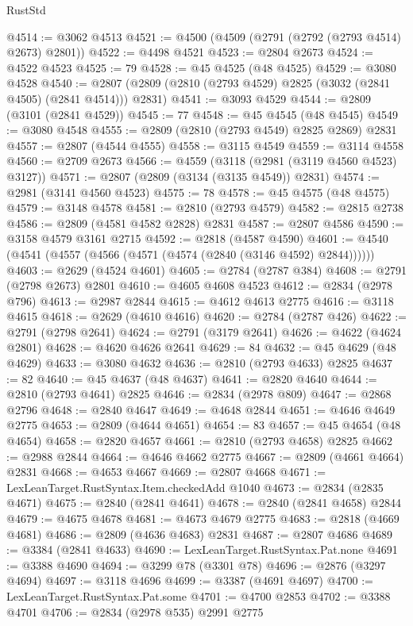 \begin{lexlean}{RustStd}
\begin{coremodule}
{\begin{coremodule}
{{{{{{{{{{{{{{{{{{{{{{{{{{{{{{{{{@4514 := @3062 @4513
@4521 := @4500 (@4509 (@2791 (@2792 (@2793 @4514) @2673) @2801))
@4522 := @4498 @4521
@4523 := @2804 @2673
@4524 := @4522 @4523
@4525 := 79
@4528 := @45 @4525 (@48 @4525)
@4529 := @3080 @4528
@4540 := @2807 (@2809 (@2810 (@2793 @4529) @2825 (@3032 (@2841 @4505) (@2841 @4514))) @2831)
@4541 := @3093 @4529
@4544 := @2809 (@3101 (@2841 @4529))
@4545 := 77
@4548 := @45 @4545 (@48 @4545)
@4549 := @3080 @4548
@4555 := @2809 (@2810 (@2793 @4549) @2825 @2869) @2831
@4557 := @2807 (@4544 @4555)
@4558 := @3115 @4549
@4559 := @3114 @4558
@4560 := @2709 @2673
@4566 := @4559 (@3118 (@2981 (@3119 @4560 @4523) @3127))
@4571 := @2807 (@2809 (@3134 (@3135 @4549)) @2831)
@4574 := @2981 (@3141 @4560 @4523)
@4575 := 78
@4578 := @45 @4575 (@48 @4575)
@4579 := @3148 @4578
@4581 := @2810 (@2793 @4579)
@4582 := @2815 @2738
@4586 := @2809 (@4581 @4582 @2828) @2831
@4587 := @2807 @4586
@4590 := @3158 @4579 @3161 @2715
@4592 := @2818 (@4587 @4590)
@4601 := @4540 (@4541 (@4557 (@4566 (@4571 (@4574 (@2840 (@3146 @4592) @2844))))))
@4603 := @2629 (@4524 @4601)
@4605 := @2784 (@2787 @384)
@4608 := @2791 (@2798 @2673) @2801
@4610 := @4605 @4608 @4523
@4612 := @2834 (@2978 @796)
@4613 := @2987 @2844
@4615 := @4612 @4613 @2775
@4616 := @3118 @4615
@4618 := @2629 (@4610 @4616)
@4620 := @2784 (@2787 @426)
@4622 := @2791 (@2798 @2641)
@4624 := @2791 (@3179 @2641)
@4626 := @4622 (@4624 @2801)
@4628 := @4620 @4626 @2641
@4629 := 84
@4632 := @45 @4629 (@48 @4629)
@4633 := @3080 @4632
@4636 := @2810 (@2793 @4633) @2825
@4637 := 82
@4640 := @45 @4637 (@48 @4637)
@4641 := @2820 @4640
@4644 := @2810 (@2793 @4641) @2825
@4646 := @2834 (@2978 @809)
@4647 := @2868 @2796
@4648 := @2840 @4647
@4649 := @4648 @2844
@4651 := @4646 @4649 @2775
@4653 := @2809 (@4644 @4651)
@4654 := 83
@4657 := @45 @4654 (@48 @4654)
@4658 := @2820 @4657
@4661 := @2810 (@2793 @4658) @2825
@4662 := @2988 @2844
@4664 := @4646 @4662 @2775
@4667 := @2809 (@4661 @4664) @2831
@4668 := @4653 @4667
@4669 := @2807 @4668
@4671 := LexLeanTarget.RustSyntax.Item.checkedAdd @1040
@4673 := @2834 (@2835 @4671)
@4675 := @2840 (@2841 @4641)
@4678 := @2840 (@2841 @4658) @2844
@4679 := @4675 @4678
@4681 := @4673 @4679 @2775
@4683 := @2818 (@4669 @4681)
@4686 := @2809 (@4636 @4683) @2831
@4687 := @2807 @4686
@4689 := @3384 (@2841 @4633)
@4690 := LexLeanTarget.RustSyntax.Pat.none
@4691 := @3388 @4690
@4694 := @3299 @78 (@3301 @78)
@4696 := @2876 (@3297 @4694)
@4697 := @3118 @4696
@4699 := @3387 (@4691 @4697)
@4700 := LexLeanTarget.RustSyntax.Pat.some
@4701 := @4700 @2853
@4702 := @3388 @4701
@4706 := @2834 (@2978 @535) @2991 @2775
}}}}}}}}}}}}}}}}}}}}}}}}}}}}}}}}}
\end{coremodule}}
\end{coremodule}
\end{lexlean}
